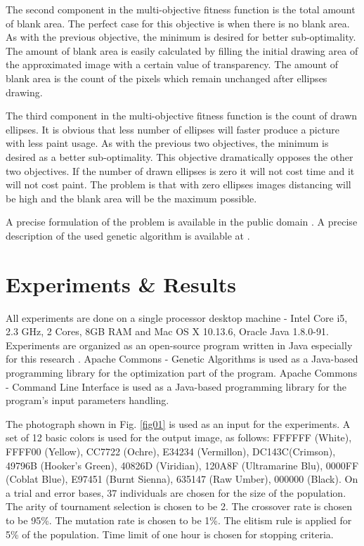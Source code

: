 \documentclass[conference]{IEEEtran}
\begin{document}
The second component in the multi-objective fitness function is the total amount of blank area. The perfect case for this objective is when there is no blank area. As with the previous objective, the minimum is desired for better sub-optimality. The amount of blank area is easily calculated by filling the initial drawing area of the approximated image with a certain value of transparency. The amount of blank area is the count of the pixels which remain unchanged after ellipses drawing. 

The third component in the multi-objective fitness function is the count of drawn ellipses. It is obvious that less number of ellipses will faster produce a picture with less paint usage. As with the previous two objectives, the minimum is desired as a better sub-optimality. This objective dramatically opposes the other two objectives. If the number of drawn ellipses is zero it will not cost time and it will not cost paint. The problem is that with zero ellipses images distancing will be high and the blank area will be the maximum possible. 

A precise formulation of the problem is available in the public domain \cite{Balabanov-2020}. A precise description of the used genetic algorithm is available at \cite{Apache-Commons-Command-Line-Interface-2020}.

\section{Experiments \& Results}

All experiments are done on a single processor desktop machine - Intel Core i5, 2.3 GHz, 2 Cores, 8GB RAM and Mac OS X 10.13.6, Oracle Java 1.8.0-91. Experiments are organized as an open-source program written in Java especially for this research \cite{Balabanov-2020}. Apache Commons - Genetic Algorithms \cite{Apache-Commons-Genetic-Algorithms-2020} is used as a Java-based programming library for the optimization part of the program. Apache Commons - Command Line Interface \cite{Apache-Commons-Command-Line-Interface-2020} is used as a Java-based programming library for the program's input parameters handling.

The photograph shown in Fig. \ref{fig01} is used as an input for the experiments. A set of 12 basic colors is used for the output image, as follows:   FFFFFF (White), FFFF00 (Yellow), CC7722 (Ochre), E34234 (Vermillon), DC143C(Crimson), 49796B (Hooker's Green), 40826D (Viridian), 120A8F (Ultramarine Blu), 0000FF (Coblat Blue), E97451 (Burnt Sienna), 635147 (Raw Umber), 000000 (Black). On a trial and error bases, 37 individuals are chosen for the size of the population. The arity of tournament selection is chosen to be 2. The crossover rate is chosen to be 95\%. The mutation rate is chosen to be 1\%. The elitism rule is applied for 5\% of the population. Time limit of one hour is chosen for stopping criteria.
\end{document}
